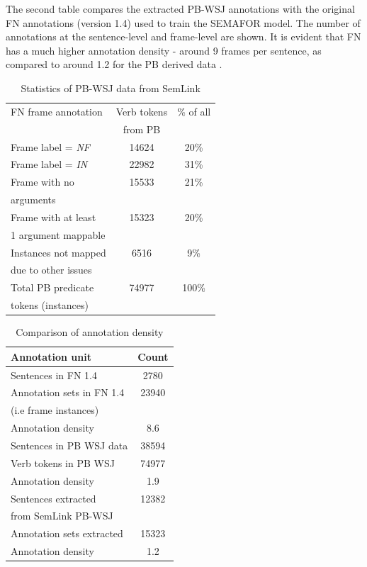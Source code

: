 \documentclass[11pt]{article}
\begin{document}
The second table compares the extracted PB-WSJ annotations with the original FN annotations (version 1.4) used to train the SEMAFOR model. The number of annotations at the sentence-level and frame-level are shown. It is evident that FN has a much higher annotation density - around 9 frames per sentence, as compared to around 1.2 for the PB derived data .


\begin{table}
\caption{Statistics of PB-WSJ data from SemLink}
\label{tab:wsjstats}
\begin{tabular}{|l|c|c|} \hline
FN frame annotation & Verb tokens & \% of all \\
& from PB & \\ \hline \hline
Frame label = \textit{NF} & 14624 & 20\%\\ \hline
Frame label = \textit{IN} & 22982 & 31\% \\ \hline
Frame with no & 15533 & 21\% \\ 
arguments  & & \\\hline
Frame with at least & 15323 & 20\% \\ 
1 argument mappable & & \\ \hline
Instances not mapped & 6516 & 9\% \\ 
due to other issues & & \\ \hline \hline
Total PB predicate & 74977 & 100\% \\
tokens (instances) & & \\ \hline
\end{tabular}
\end{table}

\begin{table}
\caption{Comparison of annotation density}
\begin{tabular}{|l|c|} \hline
\label{tab:annoUnit}
Annotation unit & Count \\\hline \hline
Sentences in FN 1.4 & 2780 \\ 
Annotation sets in FN 1.4 & 23940 \\ %
(i.e frame instances) & \\ 
Annotation density & 8.6 \\ \hline \hline
Sentences in PB WSJ data &  38594 \\ 
Verb tokens in PB WSJ & 74977 \\ 
Annotation density &  1.9 \\\hline \hline
Sentences extracted & 12382\\ 
from SemLink PB-WSJ & \\ 
Annotation sets extracted & 15323\\ 
Annotation density & 1.2 \\ \hline 
\end{tabular}
\end{table}
\end{document}
